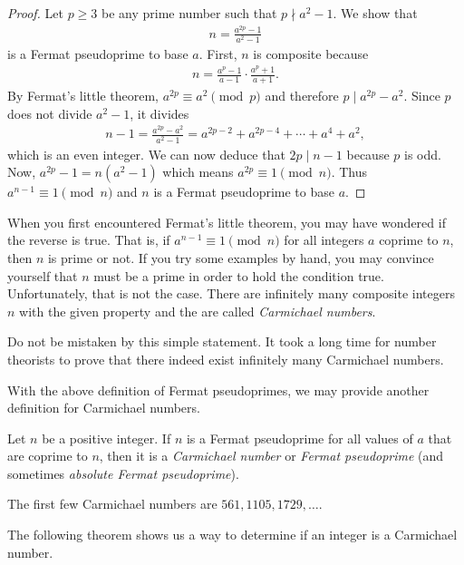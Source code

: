 \documentclass{subfile}
\begin{document}
		\begin{proof}
			Let $p\geq 3$ be any prime number such that $p \nmid a^2-1$. We show that
				\begin{align*}
					n = \frac{a^{2p}-1}{a^2-1}
				\end{align*}
			is a Fermat pseudoprime to base $a$. First, $n$ is composite because
				\begin{align*}
					n = \frac{a^p-1}{a-1}\cdot \frac{a^p+1}{a+1}.
				\end{align*}
			By Fermat's little theorem, $a^{2p} \equiv a^2 \pmod p$ and therefore $p\mid a^{2p}-a^2$. Since $p$ does not divide $a^2-1$, it divides
				\begin{align*}
					n-1 = \frac{a^{2p}-a^2}{a^2-1} = a^{2p-2}+a^{2p-4}+\cdots+a^4+a^2,
				\end{align*}
			which is an even integer. We can now deduce that $2p \mid n-1$ because $p$ is odd. Now, $a^{2p}-1 = n\left(a^2-1\right)$ which means $a^{2p} \equiv 1 \pmod n$. Thus $a^{n-1}\equiv 1 \pmod n$ and $n$ is a Fermat pseudoprime to base $a$.
		\end{proof}
	When you first encountered Fermat's little theorem, you may have wondered if the reverse is true. That is, if $a^{n-1}\equiv 1\pmod n$ for all integers $a$ coprime to $n$, then $n$ is prime or not. If you try some examples by hand, you may convince yourself that $n$ must be a prime in order to hold the condition true. Unfortunately, that is not the case. There are infinitely many composite integers $n$ with the given property and the are called \textit{Carmichael numbers}. 
	\begin{note}
		Do not be mistaken by this simple statement. It took a long time for number theorists to prove that there indeed exist infinitely many Carmichael numbers.
	\end{note}
	With the above definition of Fermat pseudoprimes, we may provide another definition for Carmichael numbers.
	
		\begin{definition}
			Let $n$ be a positive integer. If $n$ is a Fermat pseudoprime for all values of $a$ that are coprime to $n$, then it is a \textit{Carmichael number} or \textit{Fermat pseudoprime} (and sometimes \textit{absolute Fermat pseudoprime}).
		\end{definition}
	
	The first few Carmichael numbers are $561, 1105, 1729, \dots$.
	
The following theorem shows us a way to determine if an integer is a Carmichael number.
\end{document}
